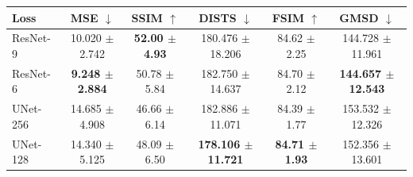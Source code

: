 \begin{tabular}{lccccc}
\hline
Loss & MSE $\downarrow$ & SSIM $\uparrow$ & DISTS $\downarrow$ & FSIM $\uparrow$ & GMSD $\downarrow$ \\
\hline
ResNet-9 & 10.020 $\pm$ 2.742 & \textbf{52.00 $\pm$ 4.93} & 180.476 $\pm$ 18.206 & 84.62 $\pm$ 2.25 & 144.728 $\pm$ 11.961 \\
ResNet-6 & \textbf{9.248 $\pm$ 2.884} & 50.78 $\pm$ 5.84 & 182.750 $\pm$ 14.637 & 84.70 $\pm$ 2.12 & \textbf{144.657 $\pm$ 12.543} \\
UNet-256 & 14.685 $\pm$ 4.908 & 46.66 $\pm$ 6.14 & 182.886 $\pm$ 11.071 & 84.39 $\pm$ 1.77 & 153.532 $\pm$ 12.326 \\
UNet-128 & 14.340 $\pm$ 5.125 & 48.09 $\pm$ 6.50 & \textbf{178.106 $\pm$ 11.721} & \textbf{84.71 $\pm$ 1.93} & 152.356 $\pm$ 13.601 \\
\hline
\end{tabular}

